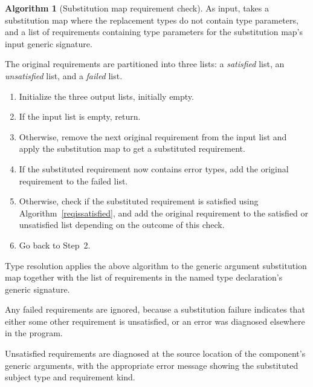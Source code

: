 \documentclass[a4paper,headsepline,bibliography=totoc,toc=flat,fleqn,twoside=semi]{scrbook}
\theoremstyle{definition}
\theoremstyle{definition}
\theoremstyle{definition}
\newtheorem{algorithm}{Algorithm}[chapter]
\begin{document}
\begin{algorithm}[Substitution map requirement check]
As input, takes a substitution map where the replacement types do not contain type parameters, and a list of requirements containing type parameters for the substitution map's input generic signature.

The original requirements are partitioned into three lists: a \emph{satisfied} list, an \emph{unsatisfied} list, and a \emph{failed} list.
\begin{enumerate}
\item Initialize the three output lists, initially empty.
\item If the input list is empty, return.
\item Otherwise, remove the next original requirement from the input list and apply the substitution map to get a substituted requirement.
\item If the substituted requirement now contains error types, add the original requirement to the failed list.
\item Otherwise, check if the substituted requirement is satisfied using Algorithm~\ref{reqissatisfied}, and add the original requirement to the satisfied or unsatisfied list depending on the outcome of this check.
\item Go back to Step~2.
\end{enumerate}
\end{algorithm}
Type resolution applies the above algorithm to the generic argument substitution map together with the list of requirements in the named type declaration's generic signature.

Any failed requirements are ignored, because a substitution failure indicates that either some other requirement is unsatisfied, or an error was diagnosed elsewhere in the program.

Unsatisfied requirements are diagnosed at the source location of the component's generic arguments, with the appropriate error message showing the substituted subject type and requirement kind.
\end{document}
